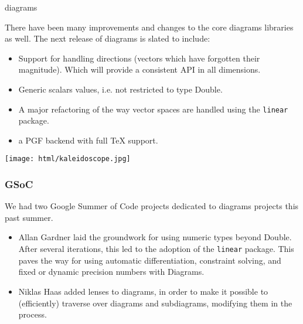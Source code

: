 \begin{hcarentry}[updated]{diagrams}

There have been many improvements and changes to the core
diagrams libraries as well.  The next release of diagrams is
slated to include:
\begin{itemize}
\item Support for handling directions (vectors which have forgotten their magnitude).
  Which will provide a consistent API in all dimensions.
\item Generic scalars values, i.e. not restricted to type 
  Double.
\item A major refactoring of the way vector spaces are handled
  using the \texttt{linear} package.
\item a PGF backend with full TeX support.
\end{itemize}


\begin{center}
\texttt{[image: html/kaleidoscope.jpg]}
\end{center}


\subsubsection*{GSoC}

We had two Google Summer of Code projects dedicated to diagrams
projects this past summer.

\begin{itemize}
\item Allan Gardner laid the groundwork for using numeric types beyond
Double.  After several iterations, this led to the adoption of the
\texttt{linear} package. This paves the way for using automatic
differentiation, constraint solving, and fixed or dynamic precision
numbers with Diagrams.
\item Niklas Haas  added lenses to diagrams, in order 
to make it possible to (efficiently) traverse over diagrams and 
subdiagrams, modifying them in the process.
\end{itemize}



\end{hcarentry}
